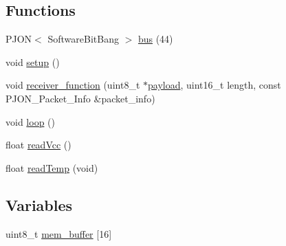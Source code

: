 \subsection*{Functions}
\begin{DoxyCompactItemize}
\item 
P\-J\-O\-N$<$ Software\-Bit\-Bang $>$ \hyperlink{ATTINY_2Local_2SoftwareBitBang_2DeviceGeneric_2DeviceGeneric_8ino_a538cbe881a4c2d02f3bd441059c41ec4}{bus} (44)
\item 
void \hyperlink{ATTINY_2Local_2SoftwareBitBang_2DeviceGeneric_2DeviceGeneric_8ino_a4fc01d736fe50cf5b977f755b675f11d}{setup} ()
\item 
void \hyperlink{ATTINY_2Local_2SoftwareBitBang_2DeviceGeneric_2DeviceGeneric_8ino_a76fc5e73c141f748dcc1809fdcfa1714}{receiver\-\_\-function} (uint8\-\_\-t $\ast$\hyperlink{Uno__Dragino__LoRa__GPS__Shield__TTN_8ino_a78a402d1762842473567de90b11ed256}{payload}, uint16\-\_\-t length, const P\-J\-O\-N\-\_\-\-Packet\-\_\-\-Info \&packet\-\_\-info)
\item 
void \hyperlink{ATTINY_2Local_2SoftwareBitBang_2DeviceGeneric_2DeviceGeneric_8ino_afe461d27b9c48d5921c00d521181f12f}{loop} ()
\item 
float \hyperlink{ATTINY_2Local_2SoftwareBitBang_2DeviceGeneric_2DeviceGeneric_8ino_a0b3195c3893f02cb1b80d878b89549d6}{read\-Vcc} ()
\item 
float \hyperlink{ATTINY_2Local_2SoftwareBitBang_2DeviceGeneric_2DeviceGeneric_8ino_ada109bb0cdc12131465dfe7a74f93b1e}{read\-Temp} (void)
\end{DoxyCompactItemize}
\subsection*{Variables}
\begin{DoxyCompactItemize}
\item 
uint8\-\_\-t \hyperlink{ATTINY_2Local_2SoftwareBitBang_2DeviceGeneric_2DeviceGeneric_8ino_ae2662dd0517ccab4cb98d64fedd7eec6}{mem\-\_\-buffer} \mbox{[}16\mbox{]}
\end{DoxyCompactItemize}


